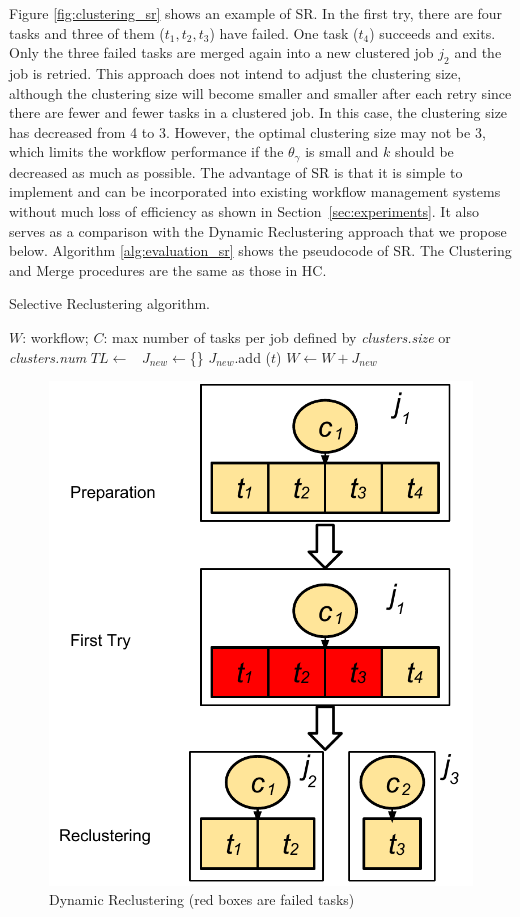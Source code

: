 \documentclass{IOS-Book-Article}
\begin{document}
Figure \ref{fig:clustering_sr} shows an example of SR. In the first try, there are four tasks and three of them ($t_1, t_2, t_3$) have failed. One task ($t_4$) succeeds and exits. Only the three failed tasks are merged again into a new clustered job $j_2$ and the job is retried. This approach does not intend to adjust the clustering size, although the clustering size will become smaller and smaller after each retry since there are fewer and fewer tasks in a clustered job. In this case, the clustering size has decreased from 4 to 3. However, the optimal clustering size may not be 3, which limits the workflow performance if the $\theta_{\gamma}$ is small and $k$ should be decreased as much as possible. The advantage of SR is that it is simple to implement and can be incorporated into existing workflow management systems without much loss of efficiency as shown in Section~\ref{sec:experiments}. It also serves as a comparison with the Dynamic Reclustering approach that we propose below. Algorithm \ref{alg:evaluation_sr} shows the pseudocode of SR. The Clustering and Merge procedures are the same as those in HC. 

\begin{algorithm}[!htb]
	\footnotesize
	\caption{Selective Reclustering algorithm. }
	\label{alg:evaluation_sr}
	\begin{algorithmic}[1]
		\Require $W$: workflow; $C$: max number of tasks per job defined by \emph{clusters.size} or \emph{clusters.num}
			\State $TL \gets$\ 
			\State $J_{new}\gets$\{\}
					\State $J_{new}$.add ($t$)
				\EndIf
			\EndFor
			\State $W \gets W + J_{new}$ 
		\EndProcedure
	\end{algorithmic}
\end{algorithm}

 

\begin{figure}[!htb]
\centering
  \includegraphics[width=0.45\linewidth]{dr.pdf}
  \caption{Dynamic Reclustering (red boxes are failed tasks)}
  \label{fig:clustering_dr}
\end{figure}
\end{document}
